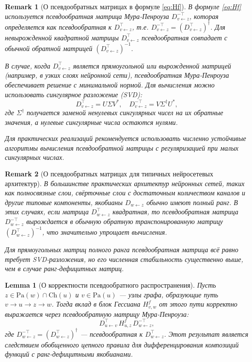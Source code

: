 \documentclass[11pt]{article}
\newtheorem{lemma}{Lemma}
\newtheorem{remark}{Remark}
\newcommand{\Pa}{\mathrm{Pa}} %
\newcommand{\Ch}{\mathrm{Ch}} %
\begin{document}
\begin{remark}[О псевдообратных матрицах в формуле \eqref{eq:Hf}]
  В формуле \eqref{eq:Hf} используется псевдообратная матрица Мура-Пенроуза $D_{v\gets z}^{-\top}$, которая
  определяется как псевдообратная к $D_{v\gets z}^{\top}$, т.е. $D_{v\gets z}^{-\top} = (D_{v\gets
  z}^{\top})^{\dagger}$. Для невырожденной квадратной матрицы $D_{v\gets
  z}^{\top}$ псевдообратная совпадает с обычной обратной матрицей $(D_{v\gets z}^{\top})^{-1}$.

  В случае, когда $D_{v\gets z}^{\top}$ является прямоугольной или вырожденной матрицей (например, в узких
  слоях нейронной сети), псевдообратная Мура-Пенроуза обеспечивает решение с минимальной нормой. Для
  вычисления можно использовать сингулярное разложение (SVD):
  \[
    D_{v\gets z}^{\top} = U\Sigma V^*, \quad D_{v\gets z}^{-\top} = V\Sigma^{\dagger} U^*,
  \]
  где $\Sigma^{\dagger}$ получается заменой ненулевых сингулярных чисел на их обратные значения, а нулевые
  сингулярные числа остаются нулями.

  Для практических реализаций рекомендуется использовать численно устойчивые алгоритмы вычисления
  псевдообратной матрицы с регуляризацией при малых сингулярных числах.
\end{remark}

\begin{remark}[О псевдообратных матрицах для типичных нейросетевых архитектур]
  В большинстве практических архитектур нейронных сетей, таких как полносвязные слои, свёрточные слои с
  достаточным количеством каналов и другие типовые компоненты, якобианы $D_{w \gets z}$ обычно имеют полный
  ранг. В этих случаях, если матрица $D_{w \gets z}^{\top}$ квадратная, то псевдообратная матрица $D_{w \gets
  z}^{-\top}$ вырождается в обычную обратную транспонированную матрицу $(D_{w \gets z}^{\top})^{-1}$, что
  значительно упрощает вычисления.

  Для прямоугольных матриц полного ранга псевдообратная матрица всё равно требует SVD-разложения, но его
  численная стабильность существенно выше, чем в случае ранг-дефицитных матриц.
\end{remark}

\begin{lemma}[О корректности псевдообратного распространения]
  Пусть $z \in \Pa(w) \cap \Ch(u)$ и $v \in \Pa(u)$ — узлы графа, образующие путь $v \rightarrow u
  \rightarrow z \rightarrow w$. Тогда вклад в блок Гессиана $H^f_{v,w}$ от этого пути корректно выражается
  через псевдообратную матрицу Мура-Пенроуза:
  \[
    D_{u\gets v}^\top\,H^f_{u,z}\,D_{w\gets z}^{-\top},
  \]
  где $D_{w\gets z}^{-\top} = (D_{w\gets z}^{\top})^{\dagger}$ — псевдообратная к $D_{w\gets z}^\top$. Этот
  результат является следствием обобщенного цепного правила для дифференцирования композиций функций с
  ранг-дефицитными якобианами.
\end{lemma}
\end{document}
